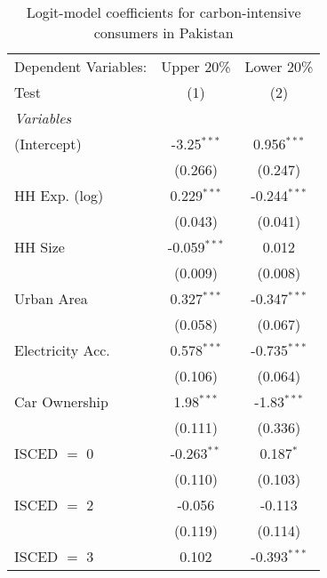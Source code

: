
\begin{table}[htbp!]
   \centering
   \small
   \begin{adjustbox}{width = 1\textwidth, max height = 0.95\textheight, center}
      \begin{threeparttable}[b]
         \caption{\label{tab:Logit_1_PAK} Logit-model coefficients for carbon-intensive consumers in Pakistan}
         \begin{tabular}{lcc}
            \tabularnewline \midrule \midrule
            Dependent Variables: & Upper 20\%     & Lower 20\%\\   
            Test                 & (1)            & (2)\\  
            \midrule
            \emph{Variables}\\
            (Intercept)          & -3.25$^{***}$  & 0.956$^{***}$\\   
                                 & (0.266)        & (0.247)\\   
            HH Exp. (log)        & 0.229$^{***}$  & -0.244$^{***}$\\   
                                 & (0.043)        & (0.041)\\   
            HH Size              & -0.059$^{***}$ & 0.012\\   
                                 & (0.009)        & (0.008)\\   
            Urban Area           & 0.327$^{***}$  & -0.347$^{***}$\\   
                                 & (0.058)        & (0.067)\\   
            Electricity Acc.     & 0.578$^{***}$  & -0.735$^{***}$\\   
                                 & (0.106)        & (0.064)\\   
            Car Ownership        & 1.98$^{***}$   & -1.83$^{***}$\\   
                                 & (0.111)        & (0.336)\\   
            ISCED $=$ 0          & -0.263$^{**}$  & 0.187$^{*}$\\   
                                 & (0.110)        & (0.103)\\   
            ISCED $=$ 2          & -0.056         & -0.113\\   
                                 & (0.119)        & (0.114)\\   
            ISCED $=$ 3          & 0.102          & -0.393$^{***}$\\   

\end{tabular}
\end{threeparttable}
\end{adjustbox}
\end{table}
